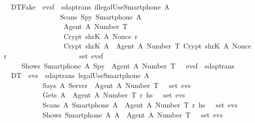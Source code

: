 \begin{isabellebody}
  \isanewline
  \ \ {\isacharbar}\ DT{}{\isacharunderscore}Fake{\isacharcolon}\ {\isachardoublequoteopen}{\isasymlbrakk}\ evs{}f\ {\isasymin}\ sdaptrans{\isacharsemicolon}\ illegalUse{\isacharparenleft}Smartphone\ A{\isacharparenright}{\isacharsemicolon}\isanewline
  \ \ \ \ \ \ \ \ \ \ \ \ \ \ \ \ \ Scans\ Spy\ {\isacharparenleft}Smartphone\ A{\isacharparenright}\ {\isasymlbrace}\isanewline
  \ \ \ \ \ \ \ \ \ \ \ \ \ \ \ \ \ \ {\isasymlbrace}Agent\ A{\isacharcomma}\ Number\ T{\isasymrbrace}{\isacharcomma}\isanewline
  \ \ \ \ \ \ \ \ \ \ \ \ \ \ \ \ \ \ Crypt\ {\isacharparenleft}shrK\ A{\isacharparenright}\ {\isacharparenleft}Nonce\ r{\isacharparenright}{\isacharcomma}\isanewline
  \ \ \ \ \ \ \ \ \ \ \ \ \ \ \ \ \ \ Crypt\ {\isacharparenleft}shrK\ A{\isacharparenright}\ {\isasymlbrace}\ {\isasymlbrace}Agent\ A{\isacharcomma}\ Number\ T{\isasymrbrace}{\isacharcomma}\ Crypt\ {\isacharparenleft}shrK\ A{\isacharparenright}\ {\isacharparenleft}Nonce\ r{\isacharparenright}\ {\isasymrbrace}\isanewline
  \ \ \ \ \ \ \ \ \ \ \ \ \ \ \ \ \ {\isasymrbrace}\ {\isasymin}\ set\ evs{}f{\isasymrbrakk}\isanewline
  \ \ \ \ \ {\isasymLongrightarrow}\ Shows\ {\isacharparenleft}Smartphone\ A{\isacharparenright}\ Spy\ {\isasymlbrace}\ Agent\ A{\isacharcomma}\ Number\ T\ {\isasymrbrace}\ {\isacharhash}\ evs{}f\ {\isasymin}\ sdaptrans{\isachardoublequoteclose}\isanewline
  \isanewline
  \ \ \isanewline
  \ \ {\isacharbar}\ DT{}{\isacharcolon}\ {\isachardoublequoteopen}{\isasymlbrakk}\ evs{}\ {\isasymin}\ sdaptrans{\isacharsemicolon}\ legalUse{\isacharparenleft}Smartphone\ A{\isacharparenright}{\isacharsemicolon}\isanewline
  \ \ \ \ \ \ \ \ \ \ \ \ Says\ A\ Server\ {\isasymlbrace}\ Agent\ A{\isacharcomma}\ Number\ T\ {\isasymrbrace}\ {\isasymin}\ set\ evs{}{\isacharsemicolon}\isanewline
  \ \ \ \ \ \ \ \ \ \ \ \ Gets\ A\ {\isasymlbrace}\ {\isasymlbrace}Agent\ A{\isacharcomma}\ Number\ T{\isasymrbrace}{\isacharcomma}\ r{\isacharprime}{\isacharcomma}\ h\isactrlsub s\ {\isasymrbrace}\ {\isasymin}\ set\ evs{}{\isacharsemicolon}\isanewline
  \ \ \ \ \ \ \ \ \ \ \ \ Scans\ A\ {\isacharparenleft}Smartphone\ A{\isacharparenright}\ {\isasymlbrace}\ {\isasymlbrace}Agent\ A{\isacharcomma}\ Number\ T{\isasymrbrace}{\isacharcomma}\ r{\isacharprime}{\isacharcomma}\ h\isactrlsub s\ {\isasymrbrace}\ {\isasymin}\ set\ evs{}{\isacharsemicolon}\isanewline
  \ \ \ \ \ \ \ \ \ \ \ \ Shows\ {\isacharparenleft}Smartphone\ A{\isacharparenright}\ A\ {\isasymlbrace}\ Agent\ A{\isacharcomma}\ Number\ T\ {\isasymrbrace}\ {\isasymin}\ set\ evs{}\ {\isasymrbrakk}\isanewline

\end{isabellebody}
